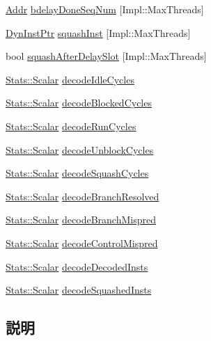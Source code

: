 \begin{DoxyCompactItemize}
\item 
\hyperlink{base_2types_8hh_af1bb03d6a4ee096394a6749f0a169232}{Addr} \hyperlink{classDefaultDecode_aa7e5b323025273d40b8cba03150ebaee}{bdelayDoneSeqNum} \mbox{[}Impl::MaxThreads\mbox{]}
\item 
\hyperlink{classDefaultDecode_a028ce10889c5f6450239d9e9a7347976}{DynInstPtr} \hyperlink{classDefaultDecode_ab16bbdee47d26fedf584262248b6b6e4}{squashInst} \mbox{[}Impl::MaxThreads\mbox{]}
\item 
bool \hyperlink{classDefaultDecode_ab0db2d75f6bf41c785017f8c3af9c16b}{squashAfterDelaySlot} \mbox{[}Impl::MaxThreads\mbox{]}
\item 
\hyperlink{classStats_1_1Scalar}{Stats::Scalar} \hyperlink{classDefaultDecode_a1037bebd5ca3880affa4633d03176747}{decodeIdleCycles}
\item 
\hyperlink{classStats_1_1Scalar}{Stats::Scalar} \hyperlink{classDefaultDecode_aa61ef46bfb5ece8742ca0ba35c596f7f}{decodeBlockedCycles}
\item 
\hyperlink{classStats_1_1Scalar}{Stats::Scalar} \hyperlink{classDefaultDecode_af217607d5162d70e22d1892d3b7f041d}{decodeRunCycles}
\item 
\hyperlink{classStats_1_1Scalar}{Stats::Scalar} \hyperlink{classDefaultDecode_a99328fc971ae507d591e100b90615c8b}{decodeUnblockCycles}
\item 
\hyperlink{classStats_1_1Scalar}{Stats::Scalar} \hyperlink{classDefaultDecode_aac9ee4c2600bd9d9915595c7008652ba}{decodeSquashCycles}
\item 
\hyperlink{classStats_1_1Scalar}{Stats::Scalar} \hyperlink{classDefaultDecode_a85271ddee50df718b95448a65de49f4f}{decodeBranchResolved}
\item 
\hyperlink{classStats_1_1Scalar}{Stats::Scalar} \hyperlink{classDefaultDecode_ac82a9e3870dbcc3d3c3a331634bf81af}{decodeBranchMispred}
\item 
\hyperlink{classStats_1_1Scalar}{Stats::Scalar} \hyperlink{classDefaultDecode_ac6135ce194bbd50f851f71e0e6049464}{decodeControlMispred}
\item 
\hyperlink{classStats_1_1Scalar}{Stats::Scalar} \hyperlink{classDefaultDecode_a2ac1cd5e0cbce47426a97fba4bb966dc}{decodeDecodedInsts}
\item 
\hyperlink{classStats_1_1Scalar}{Stats::Scalar} \hyperlink{classDefaultDecode_a7bd44f968f6e156e212a8c275066ec40}{decodeSquashedInsts}
\end{DoxyCompactItemize}


\subsection{説明}
